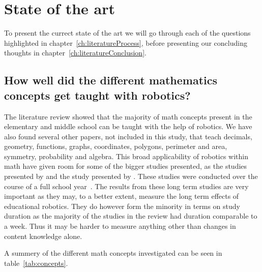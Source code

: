 \chapter{State of the art}\label{ch:stateOfArt}
To present the currect state of the art we will go through each of the questions highlighted in chapter~\ref{ch:literatureProcess}, before presenting our concluding thoughts in chapter~\ref{ch:literatureConclusion}.

\section{How well did the different mathematics concepts get taught with robotics?}
The literature review showed that the majority of math concepts present in the elementary and middle school can be taught with the help of robotics. We have also found several other papers, not included in this study, that teach decimals, geometry, functions, graphs, coordinates, polygons, perimeter and area, symmetry, probability and algebra.
This broad applicability of robotics within math have given room for some of the bigger studies presented, as the studies presented by \citeauthor{hussain2006effect} and the study presented by \citeauthor{lindh2007does}. These studies were conducted over the course of a full school year~\cite{hussain2006effect,lindh2007does}. 
The results from these long term studies are very important as they may, to a better extent, measure the long term effects of educational robotics. 
They do however form the minority in terms on study duration as the majority of the studies in the review had duration comparable to a week. 
Thus it may be harder to measure anything other than changes in content knowledge alone.

\bigskip\noindent
A summery of the different math concepts investigated can be seen in table~\ref{tab:concepts}. 

